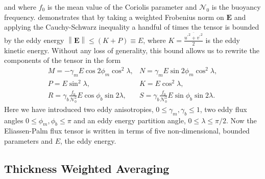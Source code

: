 \documentclass[12pt,a4paper]{report}
\newcommand*\mean[1]{\overline{#1}}
\newcommand*\res[1]{{#1}^{\prime}}
\begin{document}
                 and where $f_{0}$ is the mean value of the Coriolis parameter and $\mathcal{N}_{0}$ is the buoyancy frequency. \cite{marshall2012framework}
                demonstrates that by taking a weighted Frobenius norm on $\boldsymbol{E} $
                and applying the Cauchy-Schwarz inequality a handful of times the 
                 tensor is bounded by the eddy energy ${\left\|\boldsymbol{E}\right\|\leq\left(K+P\right)\equiv E}$,
                 where $K=\frac{\mean{{\res{u}}^{2} + {\res{v}}^{2}}}{2}$ is the eddy
                 kinetic energy.
                 Without any loss of generality, this bound allows us to rewrite the components of the tensor in the form
                 \begin{equation}
                 \begin{array}{cc}
                 M = -\gamma_{m}E\cos{2\phi_{m}}\cos^{2}{\lambda}, & 
                 N = \gamma_{m}E\sin{2\phi_{m}}\cos^{2}{\lambda}, \\
                 P =  E\sin^{2}{\lambda}, &  K =  E\cos^{2}{\lambda},  \\
                 R =  \gamma_{b}\frac{f_{0}}{\mathcal{N}_{0}^{2}}E\cos{\phi_{b}}\sin{2\lambda}, &
                 S = \gamma_{b}\frac{f_{0}}{\mathcal{N}_{0}^{2}}E\sin{\phi_{b}}\sin{2\lambda} .
                 \end{array} 
                 \end{equation}
                 Here we have introduced two eddy anisotropies, $0\leq\gamma_{m},\gamma_{b}\leq1$, two eddy flux angles $0\leq\phi_{m},\phi_{b}\leq\pi$ and an eddy energy partition angle,
                 $0\leq\lambda\leq\pi/2$. Now the Eliassen-Palm flux tensor
                 is written in terms of five non-dimensional, bounded parameters
                 and $E$, the eddy energy.
                 
                 
                 
                 \subsection{Thickness Weighted Averaging}
                 \label{youngtwa}
                 
\end{document}

